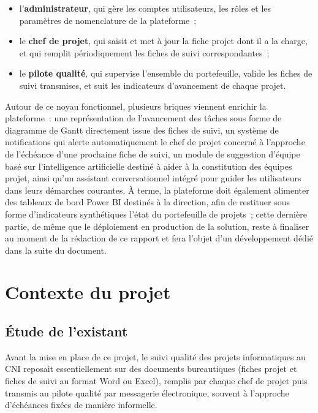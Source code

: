 \begin{itemize}[label=--]
    \item l'\textbf{administrateur}, qui gère les comptes utilisateurs, les rôles et les paramètres de nomenclature de la plateforme~;
    \item le \textbf{chef de projet}, qui saisit et met à jour la fiche projet dont il a la charge, et qui remplit périodiquement les fiches de suivi correspondantes~;
    \item le \textbf{pilote qualité}, qui supervise l'ensemble du portefeuille, valide les fiches de suivi transmises, et suit les indicateurs d'avancement de chaque projet.
\end{itemize}

Autour de ce noyau fonctionnel, plusieurs briques viennent enrichir la plateforme~: une représentation de l'avancement des tâches sous forme de diagramme de Gantt directement issue des fiches de suivi, un système de notifications qui alerte automatiquement le chef de projet concerné à l'approche de l'échéance d'une prochaine fiche de suivi, un module de suggestion d'équipe basé sur l'intelligence artificielle destiné à aider à la constitution des équipes projet, ainsi qu'un assistant conversationnel intégré pour guider les utilisateurs dans leurs démarches courantes. À terme, la plateforme doit également alimenter des tableaux de bord Power BI destinés à la direction, afin de restituer sous forme d'indicateurs synthétiques l'état du portefeuille de projets~; cette dernière partie, de même que le déploiement en production de la solution, reste à finaliser au moment de la rédaction de ce rapport et fera l'objet d'un développement dédié dans la suite du document.

\section{Contexte du projet}
\label{sec:contexte-projet}

\subsection{Étude de l'existant}
\label{subsec:etude-existant}

Avant la mise en place de ce projet, le suivi qualité des projets informatiques au CNI reposait essentiellement sur des documents bureautiques (fiches projet et fiches de suivi au format Word ou Excel), remplis par chaque chef de projet puis transmis au pilote qualité par messagerie électronique, souvent à l'approche d'échéances fixées de manière informelle. 

